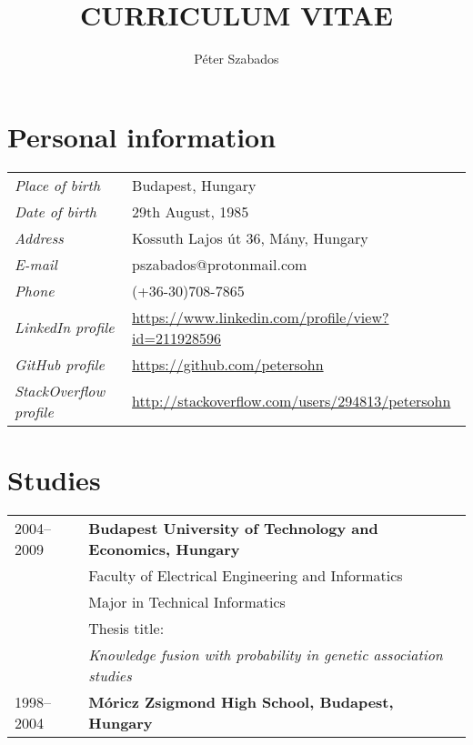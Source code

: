 \documentclass[a4paper,10pt]{article}
\title{\textbf{CURRICULUM VITAE}}
\author{Péter Szabados}
\newcommand{\pont}[1]{\emph{#1}}
\begin{document}
\maketitle

\section*{Personal information}
\begin{tabular}{ll}
 \pont{Place of birth}&Budapest, Hungary\\
 \pont{Date of birth}&29th August, 1985\\
 \pont{Address}&Kossuth Lajos út 36, Mány, Hungary\\
 \pont{E-mail}&pszabados@protonmail.com\\
 \pont{Phone}&(+36-30)708-7865\\
 \pont{LinkedIn profile}&\href{https://www.linkedin.com/profile/view?id=211928596}{https://www.linkedin.com/profile/view?id=211928596}\\
 \pont{GitHub profile}&\href{https://github.com/petersohn}{https://github.com/petersohn}\\
 \pont{StackOverflow profile}&\href{http://stackoverflow.com/users/294813/petersohn}{http://stackoverflow.com/users/294813/petersohn}\\
\end{tabular}

\section*{Studies}
\begin{tabular}{ll}
 2004--2009
  &\textbf{Budapest University of Technology and Economics, Hungary}\\
  &Faculty of Electrical Engineering and Informatics\\
  &Major in Technical Informatics\\
  &Thesis title:\\
  &\emph{Knowledge fusion with probability in genetic association studies}\\
  1998--2004&\textbf{Móricz Zsigmond High School, Budapest, Hungary}
\end{tabular}
\end{document}
